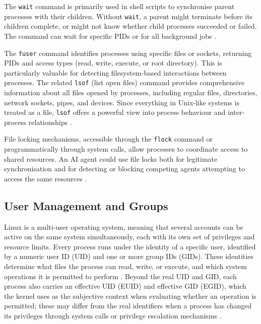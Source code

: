 The \texttt{wait} command is primarily used in shell scripts to synchronise parent processes with their children. Without \texttt{wait}, a parent might terminate before its children complete, or might not know whether child processes succeeded or failed. The command can wait for specific PIDs or for all background jobs \parencite[3.2]{GnuBashManual}.

The \texttt{fuser} command identifies processes using specific files or sockets, returning PIDs and access types (read, write, execute, or root directory). This is particularly valuable for detecting filesystem-based interactions between processes. The related \texttt{lsof} (list open files) command provides comprehensive information about all files opened by processes, including regular files, directories, network sockets, pipes, and devices. Since everything in Unix-like systems is treated as a file, \texttt{lsof} offers a powerful view into process behaviour and inter-process relationships \parencite{LinuxManPages}.

File locking mechanisms, accessible through the \texttt{flock} command or programmatically through system calls, allow processes to coordinate access to shared resources. An AI agent could use file locks both for legitimate synchronisation and for detecting or blocking competing agents attempting to access the same resources \parencite{KernelFSLocking}.

\subsection{User Management and Groups}
\label{UserManagement}

Linux is a multi-user operating system, meaning that several accounts can be active on the same system simultaneously, each with its own set of privileges and resource limits. Every process runs under the identity of a specific user, identified by a numeric user ID (UID) and one or more group IDs (GIDs). These identities determine what files the process can read, write, or execute, and which system operations it is permitted to perform \parencite{KernelCredentials}. Beyond the real UID and GID, each process also carries an effective UID (EUID) and effective GID (EGID), which the kernel uses as the subjective context when evaluating whether an operation is permitted; these may differ from the real identifiers when a process has changed its privileges through system calls or privilege escalation mechanisms \parencite{KernelCredentials}.

